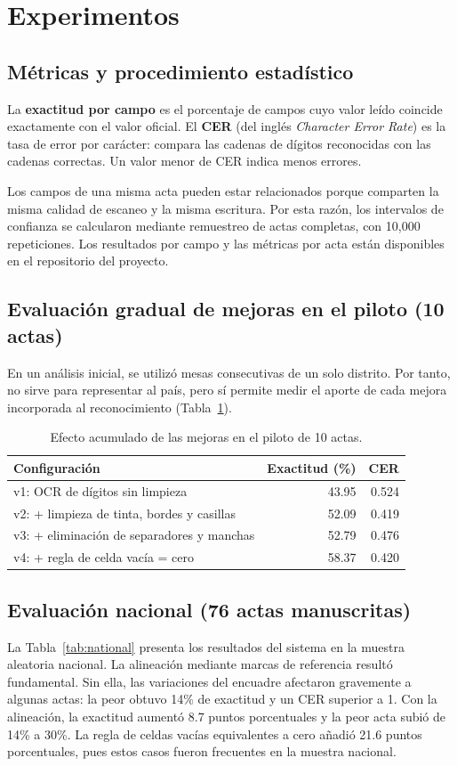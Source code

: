 \documentclass[conference]{IEEEtran}
\begin{document}
\section{Experimentos}
\subsection{M\'etricas y procedimiento estad\'istico}
La \textbf{exactitud por campo} es el porcentaje de campos cuyo valor le\'ido
coincide exactamente con el valor oficial. El \textbf{CER} (del ingl\'es
\emph{Character Error Rate}) es la tasa de error por car\'acter: compara las
cadenas de d\'igitos reconocidas con las cadenas correctas. Un valor menor de
CER indica menos errores.

Los campos de una misma acta pueden estar relacionados porque comparten la
misma calidad de escaneo y la misma escritura. Por esta raz\'on, los intervalos
de confianza se calcularon mediante remuestreo de actas completas, con 10,000
repeticiones. Los resultados por campo y las m\'etricas por acta est\'an
disponibles en el repositorio del proyecto.

\subsection{Evaluaci\'on gradual de mejoras en el piloto (10 actas)}
En un análisis inicial, se utiliz\'o mesas consecutivas de un solo distrito. Por tanto, no sirve para representar al pa\'is, pero s\'i permite medir el aporte de cada mejora incorporada al reconocimiento (Tabla~\ref{tab:pilot}).

\begin{table}[t]
\caption{Efecto acumulado de las mejoras en el piloto de 10 actas.}
\label{tab:pilot}
\centering
\begin{tabular}{lrr}
\toprule
Configuraci\'on & Exactitud (\%) & CER \\
\midrule
v1: OCR de d\'igitos sin limpieza & 43.95 & 0.524 \\
v2: + limpieza de tinta, bordes y casillas & 52.09 & 0.419 \\
v3: + eliminaci\'on de separadores y manchas & 52.79 & 0.476 \\
v4: + regla de celda vac\'ia = cero & 58.37 & 0.420 \\
\bottomrule
\end{tabular}
\end{table}

\subsection{Evaluaci\'on nacional (76 actas manuscritas)}
La Tabla~\ref{tab:national} presenta los resultados del sistema en la muestra
aleatoria nacional. La alineaci\'on mediante marcas de referencia result\'o
fundamental. Sin ella, las variaciones del encuadre afectaron gravemente a
algunas actas: la peor obtuvo 14\% de exactitud y un CER superior a 1. Con la
alineaci\'on, la exactitud aument\'o 8.7 puntos porcentuales y la peor acta
subi\'o de 14\% a 30\%. La regla de celdas vac\'ias equivalentes a cero a\~nadi\'o
21.6 puntos porcentuales, pues estos casos fueron frecuentes en la muestra
nacional.
\end{document}

